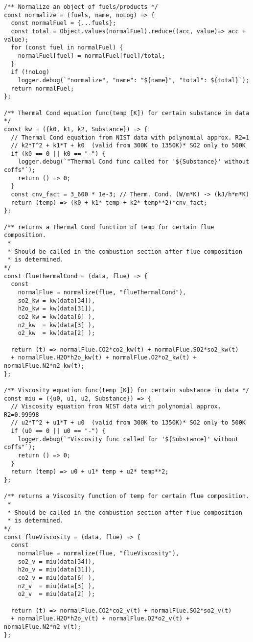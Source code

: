 \begin{verbatim}
/** Normalize an object of fuels/products */
const normalize = (fuels, name, noLog) => {
  const normalFuel = {...fuels};
  const total = Object.values(normalFuel).reduce((acc, value)=> acc + value);
  for (const fuel in normalFuel) {
    normalFuel[fuel] = normalFuel[fuel]/total;
  }
  if (!noLog) 
    logger.debug(`"normalize", "name": "${name}", "total": ${total}`);
  return normalFuel;
};

/** Thermal Cond equation func(temp [K]) for certain substance in data */
const kw = ({k0, k1, k2, Substance}) => {
  // Thermal Cond equation from NIST data with polynomial approx. R2=1
  // k2*T^2 + k1*T + k0  (valid from 300K to 1350K)* SO2 only to 500K
  if (k0 == 0 || k0 == "-") {
    logger.debug(`"Thermal Cond func called for '${Substance}' without coffs"`);
    return () => 0;
  }
  const cnv_fact = 3_600 * 1e-3; // Therm. Cond. (W/m*K) -> (kJ/h*m*K)
  return (temp) => (k0 + k1* temp + k2* temp**2)*cnv_fact;
};

/** returns a Thermal Cond function of temp for certain flue composition.
 * 
 * Should be called in the combustion section after flue composition 
 * is determined.
*/
const flueThermalCond = (data, flue) => {
  const 
    normalFlue = normalize(flue, "flueThermalCond"),
    so2_kw = kw(data[34]),
    h2o_kw = kw(data[31]),
    co2_kw = kw(data[6] ),
    n2_kw  = kw(data[3] ),
    o2_kw  = kw(data[2] );

  return (t) => normalFlue.CO2*co2_kw(t) + normalFlue.SO2*so2_kw(t)
  + normalFlue.H2O*h2o_kw(t) + normalFlue.O2*o2_kw(t) + normalFlue.N2*n2_kw(t);
};

/** Viscosity equation func(temp [K]) for certain substance in data */
const miu = ({u0, u1, u2, Substance}) => {
  // Viscosity equation from NIST data with polynomial approx. R2=0.99998
  // u2*T^2 + u1*T + u0  (valid from 300K to 1350K)* SO2 only to 500K
  if (u0 == 0 || u0 == "-") {
    logger.debug(`"Viscosity func called for '${Substance}' without coffs"`);
    return () => 0;
  }
  return (temp) => u0 + u1* temp + u2* temp**2;
};

/** returns a Viscosity function of temp for certain flue composition.
 * 
 * Should be called in the combustion section after flue composition 
 * is determined.
*/
const flueViscosity = (data, flue) => {
  const 
    normalFlue = normalize(flue, "flueViscosity"),
    so2_v = miu(data[34]),
    h2o_v = miu(data[31]),
    co2_v = miu(data[6] ),
    n2_v  = miu(data[3] ),
    o2_v  = miu(data[2] );

  return (t) => normalFlue.CO2*co2_v(t) + normalFlue.SO2*so2_v(t)
  + normalFlue.H2O*h2o_v(t) + normalFlue.O2*o2_v(t) + normalFlue.N2*n2_v(t);
};


\end{verbatim}
